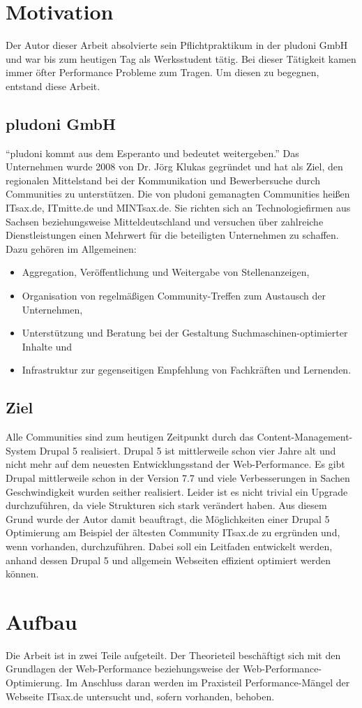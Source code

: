 \section{Motivation}
Der Autor dieser Arbeit absolvierte sein Pflichtpraktikum in der pludoni GmbH und war bis zum heutigen Tag als Werksstudent tätig. Bei dieser T\"atigkeit kamen immer \"ofter Performance Probleme zum Tragen. Um diesen zu begegnen, entstand diese Arbeit.
\subsection{pludoni GmbH}
“pludoni kommt aus dem Esperanto und bedeutet weitergeben.” \citep{Klukas2011}
Das Unternehmen wurde 2008 von Dr. Jörg Klukas gegründet und hat als Ziel, den regionalen Mittelstand bei der Kommunikation und Bewerbersuche durch Communities zu unterstützen. Die von pludoni gemanagten Communities heißen ITsax.de, ITmitte.de und MINTsax.de. Sie richten sich an Technologiefirmen aus Sachsen beziehungsweise Mitteldeutschland und versuchen über zahlreiche Dienstleistungen einen Mehrwert für die beteiligten Unternehmen zu schaffen. Dazu geh\"oren im Allgemeinen:

\begin{itemize}
 \item Aggregation, Veröffentlichung und Weitergabe von Stellenanzeigen,
 \item Organisation von regelmäßigen Community-Treffen zum Austausch der Unternehmen,
 \item Unterstützung und Beratung bei der Gestaltung Suchmaschinen-optimierter Inhalte und
 \item Infrastruktur zur gegenseitigen Empfehlung von Fachkräften und Lernenden.
\end{itemize}

\subsection{Ziel}
Alle Communities sind zum heutigen Zeitpunkt durch das Content-Management-System Drupal 5 realisiert. Drupal 5 ist mittlerweile schon vier Jahre alt und nicht mehr auf dem neuesten Entwicklungsstand der Web-Performance. Es gibt Drupal mittlerweile schon in der Version 7.7 und viele Verbesserungen in Sachen Geschwindigkeit wurden seither realisiert. Leider ist es nicht trivial ein Upgrade durchzuführen, da viele Strukturen sich stark verändert haben. Aus diesem Grund wurde der Autor damit beauftragt, die Möglichkeiten einer Drupal 5 Optimierung am Beispiel der ältesten Community ITsax.de zu ergründen und, wenn vorhanden, durchzuführen. Dabei soll ein Leitfaden entwickelt werden, anhand dessen Drupal 5 und allgemein Webseiten effizient optimiert werden können.

\section{Aufbau}
Die Arbeit ist in zwei Teile aufgeteilt. Der Theorieteil beschäftigt sich mit den Grundlagen der Web-Performance beziehungsweise der Web-Performance-Optimierung. Im Anschluss daran werden im Praxisteil Performance-Mängel der Webseite ITsax.de untersucht und, sofern vorhanden, behoben. 
